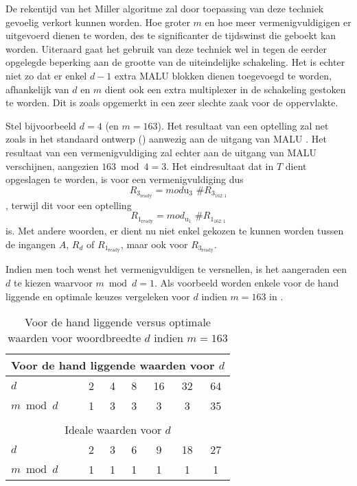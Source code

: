 De rekentijd van het Miller algoritme zal door toepassing van deze techniek gevoelig verkort kunnen worden. Hoe groter $m$ en hoe meer vermenigvuldigigen er uitgevoerd dienen te worden, des te significanter de tijdswinst die geboekt kan worden. Uiteraard gaat het gebruik van deze techniek wel in tegen de eerder opgelegde beperking aan de grootte van de uiteindelijke schakeling. Het is echter niet zo dat er enkel $d - 1$ extra MALU blokken dienen toegevoegd te worden, afhankelijk van $d$ en $m$ dient ook een extra multiplexer in de schakeling gestoken te worden. Dit is zoals opgemerkt in  een zeer slechte zaak voor de  oppervlakte.

Stel bijvoorbeeld $d = 4$ (en $m = 	163$). Het resultaat van een optelling zal net zoals in het standaard ontwerp () aanwezig aan de uitgang van MALU . Het resultaat van een vermenigvuldiging zal echter aan de uitgang van MALU  verschijnen, aangezien $163 \bmod 4 = 3$. Het eindresultaat dat in $T$ dient opgeslagen te worden, is voor een vermenigvuldiging dus
\[R_{3_{\text{ready}}} = mod{\text{u}_3} \text{ \# } R_{3_{162:1}}\]
, terwijl dit voor een optelling
\[R_{1_{\text{ready}}} = mod_{\text{u}_1} \text{ \# } R_{1_{162:1}}\]
is. Met andere woorden, er dient nu niet enkel gekozen te kunnen worden tussen de ingangen $A$, $R_d$ of $R_{1_{\text{ready}}}$, maar ook voor $R_{3_{\text{ready}}}$.

Indien men toch wenst het vermenigvuldigen te versnellen, is het aangeraden een $d$ te kiezen waarvoor $m \bmod d = 1$. Als voorbeeld worden enkele voor de hand liggende en optimale keuzes vergeleken voor $d$ indien $m = 163$ in .

\begin{table}[h]
	\caption{Voor de hand liggende versus optimale waarden voor woordbreedte $d$ indien \mbox{$m=163$}}
	\label{tabel-implementatie-woordbreedte-d}
	\begin{tabular}{|l|c|c|c|c|c|c|}
		\hline
		\multicolumn{7}{|c|}{Voor de hand liggende waarden voor $d$}\\
		\hline
		$d$			& 2	& 4	& 8	& 16	& 32	& 64\\
		$m \bmod d$	& 1	& 3	& 3	& 3	& 3	& 35\\
		\hline
		\multicolumn{7}{c}{}\\
		\hline
		\multicolumn{7}{|c|}{Ideale waarden voor $d$}\\
		\hline
		$d$			& 2	& 3	& 6	& 9	& 18	& 27\\
		$m \bmod d$	& 1	& 1	& 1	& 1	& 1	& 1\\
		\hline
	\end{tabular}
\end{table}

